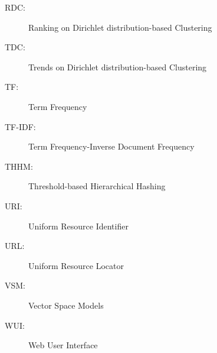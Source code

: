 \begin{description}
	\item[RDC:] Ranking on Dirichlet distribution-based Clustering
	\item[TDC:] Trends on Dirichlet distribution-based Clustering
	\item[TF:] Term Frequency
	\item[TF-IDF:] Term Frequency-Inverse Document Frequency
	\item[THHM:] Threshold-based Hierarchical Hashing
	\item[URI:] Uniform Resource Identifier
	\item[URL:] Uniform Resource Locator
	\item[VSM:] Vector Space Models
	\item[WUI:] Web User Interface
\end{description}









